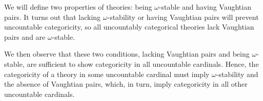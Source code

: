 We will define two properties of theories: being \(\omega\)-stable and having Vaughtian pairs. 
It turns out that lacking \(\omega\)-stability or having Vaughtian pairs will prevent uncountable categoricity, so all uncountably categorical theories lack Vaughtian pairs and are \(\omega\)-stable. 

We then observe that these two conditions, lacking Vaughtian pairs and being \(\omega\)-stable, are sufficient to show categoricity in all uncountable cardinals. 
Hence, the categoricity of a theory in some uncountable cardinal must imply \(\omega\)-stability and the absence of Vaughtian pairs, which, in turn, imply categoricity in all other uncountable cardinals.

